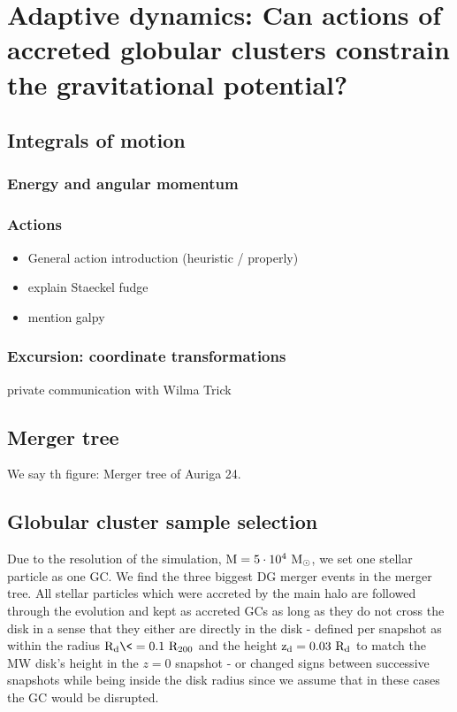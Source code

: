 \section{Adaptive dynamics: Can actions of accreted globular clusters constrain the gravitational potential?}\label{sec:Dynamics}
\subsection{Integrals of motion}

\subsubsection{Energy and angular momentum}
\subsubsection{Actions}
\begin{itemize}
    \item General action introduction (heuristic / properly)
    \item explain Staeckel fudge
    \item mention galpy
    
\end{itemize}

\subsubsection{Excursion: coordinate transformations}
private communication with Wilma Trick
\subsection{Merger tree}
We say th
figure: Merger tree of Auriga 24. 
\subsection{Globular cluster sample selection}\label{subsec:GC_selection}
Due to the resolution of the simulation, $\rm{M} = 5 \cdot 10 ^ 4\ M_{\odot}$, we set one stellar particle as one \ac{GC}. We find the three biggest \ac{DG} merger events in the merger tree. All stellar particles which were accreted by the main halo are followed through the evolution and kept as accreted \acp{GC} as long as they do not cross the disk in a sense that they either are directly in the disk - defined per snapshot as within the radius $\rm{R}_d \<= 0.1 \ R_{200}$ and the height $\rm{z}_d = 0.03\ R_d$ to match the \ac{MW} disk's height in the $z = 0$ snapshot - or changed signs between successive snapshots while being inside the disk radius since we assume that in these cases the \ac{GC} would be disrupted. 


